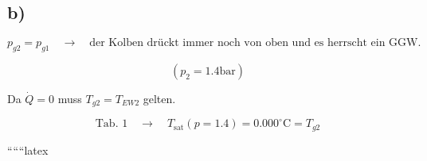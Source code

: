 

\subsection*{b)}

\begin{equation*}
p_{g2} = p_{g1} \quad \rightarrow \quad \text{der Kolben drückt immer noch von oben und es herrscht ein GGW.}
\end{equation*}

\begin{equation*}
(p_{2} = 1.4 \text{bar})
\end{equation*}

Da $\dot{Q} = 0$ muss $T_{g2} = T_{EW2}$ gelten.

\begin{equation*}
\text{Tab. 1} \quad \rightarrow \quad T_{\text{sat}} (p = 1.4) = 0.000^\circ \text{C} = T_{g2}
\end{equation*}

``````latex